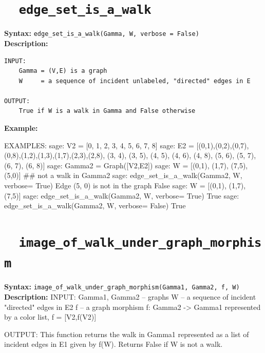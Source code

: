 \documentclass{article}
\begin{document}
\section{\tt \ \  edge\_set\_is\_a\_walk}
  
\textbf{Syntax:} \verb}edge_set_is_a_walk(Gamma, W, verbose = False)}\\

\textbf{Description:}
\begin{verbatim}
INPUT:
    Gamma = (V,E) is a graph
    W     = a sequence of incident unlabeled, "directed" edges in E

OUTPUT: 
    True if W is a walk in Gamma and False otherwise
\end{verbatim}

\textbf{Example:}
\begin{spverbatim}
    EXAMPLES:
        sage: V2 = [0, 1, 2, 3, 4, 5, 6, 7, 8]
        sage: E2 = [(0,1),(0,2),(0,7),(0,8),(1,2),(1,3),(1,7),(2,3),(2,8), (3, 4), (3, 5), (4, 5), (4, 6), (4, 8), (5, 6), (5, 7), (6, 7), (6, 8)]
        sage: Gamma2 = Graph([V2,E2])
        sage: W = [(0,1), (1,7), (7,5), (5,0)] ## not a walk in Gamma2
        sage: edge_set_is_a_walk(Gamma2, W, verbose= True)
        Edge (5, 0) is not in the graph
        False
        sage: W = [(0,1), (1,7), (7,5)]
        sage: edge_set_is_a_walk(Gamma2, W, verbose= True)
        True
        sage: edge_set_is_a_walk(Gamma2, W, verbose= False)
        True
\end{spverbatim}

\section{\tt \ \  image\_of\_walk\_under\_graph\_morphism}

\textbf{Syntax:} \verb}image_of_walk_under_graph_morphism(Gamma1, Gamma2, f, W)}\\

\textbf{Description:}
INPUT:
    Gamma1, Gamma2 -- graphs
          W        -- a sequence of incident "directed" edges in E2
          f        -- a graph morphism f: Gamma2 -> Gamma1 represented by a
                      color list, f = [V2,f(V2)]
     
OUTPUT:
    This function returns the walk in Gamma1 represented
    as a list of incident edges in E1 given by f(W).
    Returns False if W is not a walk.
\end{document}
